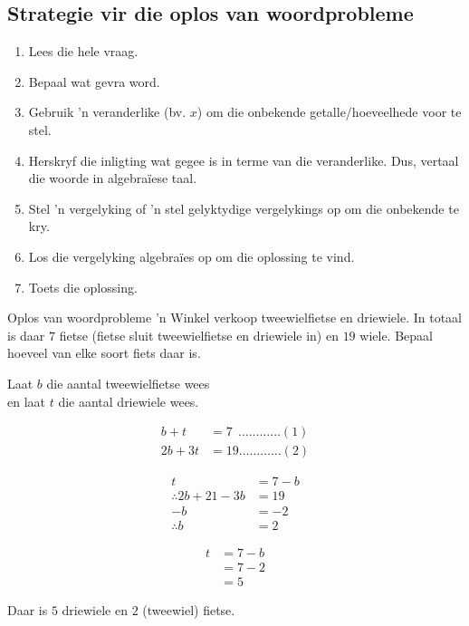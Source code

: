 \subsection*{Strategie vir die oplos van woordprobleme}

\begin{enumerate}[noitemsep, label=\textbf{\arabic*}. ] 
\item Lees die hele vraag.
\item Bepaal wat gevra word.
\item Gebruik ’n veranderlike (bv. $x$) om die onbekende getalle/hoeveelhede voor te stel.
\item  Herskryf die inligting wat gegee is in terme van die veranderlike. Dus, vertaal die woorde in algebraïese
taal.
\item Stel ’n vergelyking of ’n stel gelyktydige vergelykings op om die onbekende te kry.
\item Los die vergelyking algebraïes op om die oplossing te vind.
\item Toets die oplossing.
\end{enumerate}


\begin{wex}
{Oplos van woordprobleme}
{
 ’n Winkel verkoop tweewielfietse en driewiele. In totaal is daar $7$ fietse (fietse sluit tweewielfietse en driewiele in) en $19$ wiele. Bepaal hoeveel van elke soort fiets daar is.
}
{
Laat $b$ die aantal tweewielfietse wees  \\
en laat $t$  die aantal driewiele wees. 

\begin{align*}
  b + t &= 7 ~~\ldots \ldots \ldots \ldots (1)\\
  2b + 3t &= 19 \ldots \ldots \ldots \ldots (2)
\end{align*}

\begin{align*}
  t &= 7-b \\
  \therefore 2b + 21 - 3b &= 19 \\
  -b &= -2 \\
  \therefore b &= 2
\end{align*}

\begin{align*}
  t &= 7-b \\
    &= 7-2 \\
    &= 5
\end{align*}

Daar is $5$ driewiele en $2$ (tweewiel) fietse.
}       
\end{wex}

